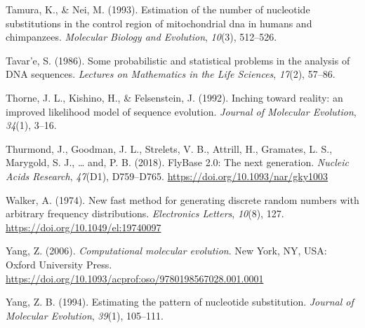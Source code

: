 \documentclass[12pt,]{article}
\begin{document}
\leavevmode\hypertarget{ref-TN93}{}%
Tamura, K., \& Nei, M. (1993). Estimation of the number of nucleotide substitutions in the control region of mitochondrial dna in humans and chimpanzees. \emph{Molecular Biology and Evolution}, \emph{10}(3), 512--526.

\leavevmode\hypertarget{ref-Tavare_1986gtr}{}%
Tavar\a'e, S. (1986). Some probabilistic and statistical problems in the analysis of DNA sequences. \emph{Lectures on Mathematics in the Life Sciences}, \emph{17}(2), 57--86.

\leavevmode\hypertarget{ref-Thorne_1992}{}%
Thorne, J. L., Kishino, H., \& Felsenstein, J. (1992). Inching toward reality: an improved likelihood model of sequence evolution. \emph{Journal of Molecular Evolution}, \emph{34}(1), 3--16.

\leavevmode\hypertarget{ref-Thurmond_2018}{}%
Thurmond, J., Goodman, J. L., Strelets, V. B., Attrill, H., Gramates, L. S., Marygold, S. J., \ldots{} and, P. B. (2018). FlyBase 2.0: The next generation. \emph{Nucleic Acids Research}, \emph{47}(D1), D759--D765. \url{https://doi.org/10.1093/nar/gky1003}

\leavevmode\hypertarget{ref-Walker_1974}{}%
Walker, A. (1974). New fast method for generating discrete random numbers with arbitrary frequency distributions. \emph{Electronics Letters}, \emph{10}(8), 127. \url{https://doi.org/10.1049/el:19740097}

\leavevmode\hypertarget{ref-Yang_2006}{}%
Yang, Z. (2006). \emph{Computational molecular evolution}. New York, NY, USA: Oxford University Press. \url{https://doi.org/10.1093/acprof:oso/9780198567028.001.0001}

\leavevmode\hypertarget{ref-Yang_1994}{}%
Yang, Z. B. (1994). Estimating the pattern of nucleotide substitution. \emph{Journal of Molecular Evolution}, \emph{39}(1), 105--111.
\end{document}
